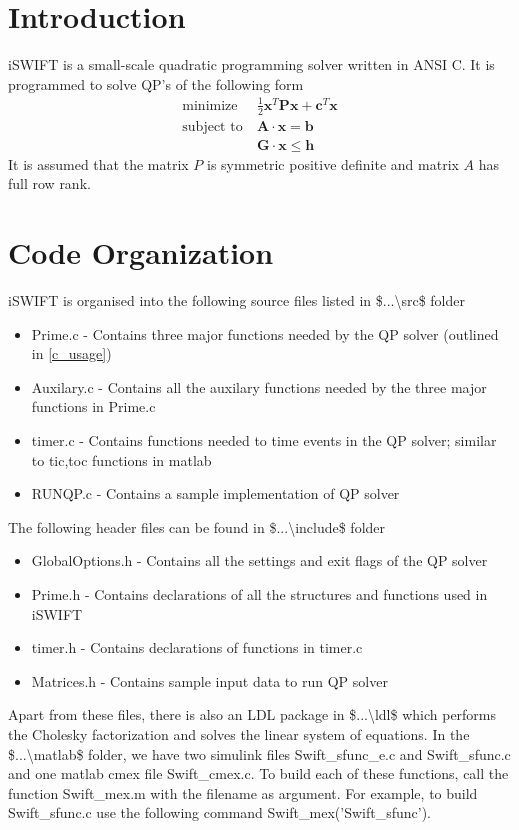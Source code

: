 \documentclass[10pt]{article}
\begin{document}
	
\maketitle


\section{Introduction}\label{sec:intro}
		iSWIFT is a small-scale quadratic programming solver written in ANSI C. It is programmed to solve QP’s of the following form
\begin{subequations}\label{eq:QP_primal}
	\begin{align}
		\text{minimize} \ & \frac{1}{2} \bm{x}^{T}\bm{P}\bm{x} + \bm{c}^{T}\bm{x} \\
		\text{subject to} \ & \bm{A}\cdot\bm{x}=\bm{b}\\
		& \bm{G}\cdot\bm{x} \leq \bm{h}
	\end{align}
\end{subequations}
It is assumed that the matrix $P$ is symmetric positive definite and matrix $A$ has full row rank.
\section{Code Organization}
	iSWIFT is organised into the following source files listed in \$...\textbackslash src\$ folder
	\begin{itemize}
		 \setlength{\itemsep}{1pt}%
		\setlength{\parskip}{0pt}%
		\item Prime.c - Contains three major functions needed by the QP solver (outlined in \ref{c_usage})
		\item Auxilary.c - Contains all the auxilary functions needed by the three major functions in Prime.c
		\item timer.c - Contains functions needed to time events in the QP solver; similar to tic,toc functions in matlab
		\item RUNQP.c - Contains a sample implementation of QP solver
	\end{itemize}
	
	The following header files can be found in \$...\textbackslash include\$ folder
\begin{itemize}
	 \setlength{\itemsep}{1pt}%
	\setlength{\parskip}{0pt}%
	\item GlobalOptions.h - Contains all the settings and exit flags of the QP solver
	\item Prime.h - Contains declarations of all the structures and functions used in iSWIFT
	\item timer.h - Contains declarations of functions in timer.c
	\item Matrices.h - Contains sample input data to run QP solver
\end{itemize}
	Apart from these files, there is also an LDL package in \$...\textbackslash ldl\$ which performs the Cholesky factorization and solves the linear system of equations. In the \$...\textbackslash matlab\$ folder, we have two simulink files Swift\_sfunc\_e.c and Swift\_sfunc.c and one matlab cmex file Swift\_cmex.c. To build each of these functions, call the function Swift\_mex.m with the filename as argument. For example, to build Swift\_sfunc.c use the following command Swift\_mex('Swift\_sfunc').
\end{document}
